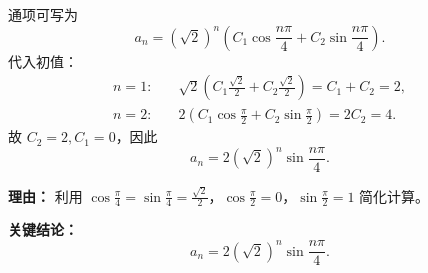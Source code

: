 \begin{examplebox}
\begin{description}[style=nextline, leftmargin=2.8em, labelsep=0.5em, itemsep=0.45em]
		\item[\textbf{第三步（通项并定系数）：}]
		      通项可写为
		      \[
			      a_n=(\sqrt2)^n\left(C_1\cos\frac{n\pi}{4}+C_2\sin\frac{n\pi}{4}\right).
		      \]
		      代入初值：
		      \[
			      \begin{aligned}
				      n=1: & \quad \sqrt2\left(C_1\frac{\sqrt2}{2}+C_2\frac{\sqrt2}{2}\right)=C_1+C_2=2, \\
				      n=2: & \quad 2\left(C_1\cos\frac{\pi}{2}+C_2\sin\frac{\pi}{2}\right)=2C_2=4.
			      \end{aligned}
		      \]
		      故 \(C_2=2,C_1=0\)，因此
		      \[
			      a_n=2(\sqrt2)^n\sin\frac{n\pi}{4}.
		      \]
		      \par\textbf{理由：} 利用 \(\cos\frac{\pi}{4}=\sin\frac{\pi}{4}=\frac{\sqrt2}{2}\)，\(\cos\frac{\pi}{2}=0\)，\(\sin\frac{\pi}{2}=1\) 简化计算。
	\end{description}

	\textbf{\textcolor{CExample}{关键结论：}}
	\[
		\boxed{a_n=2(\sqrt2)^n\sin\frac{n\pi}{4}}.
	\]
\end{examplebox}